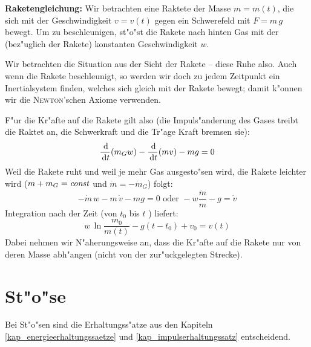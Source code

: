 \begin{Beispiel}
   \textbf{Raketengleichung:} Wir betrachten
   eine Raktete der Masse $m = m(t)$, die sich mit der Geschwindigkeit
   $v = v(t)$ gegen ein Schwerefeld mit $F = m\, g$ bewegt. Um zu
   beschleunigen, st"o"st die Rakete nach hinten Gas mit der
   (bez"uglich der Rakete) konstanten Geschwindigkeit $w$.

   Wir betrachten die Situation aus der Sicht der Rakete -- diese Ruhe
   also. Auch wenn die Rakete beschleunigt, so werden wir doch zu jedem
   Zeitpunkt ein Inertialsystem finden, welches sich gleich mit der
   Rakete bewegt; damit k"onnen wir die \textsc{Newton}'schen Axiome
   verwenden.

   F"ur die Kr"afte auf die Rakete gilt also (die Impuls"anderung des
   Gases treibt die Raktet an, die Schwerkraft und die Tr"age Kraft
   bremsen sie):
   \begin{equation*}
    \frac{\, \mathrm{d} }{\, \mathrm{d} t} (m_G w)  -  \frac{\, \mathrm{d} }{\, \mathrm{d} t}(mv)  -
    mg = 0
   \end{equation*}
   Weil die Rakete ruht und weil je mehr Gas ausgesto"sen wird, die
   Rakete leichter wird ($m + m_G = \text{\emph{const}}$ und $\dot m = -\dot m_G$)
   folgt:
   \begin{equation*}
      -\dot m \, w   - m \,\dot v   - mg = 0
\text{ oder }
-w \frac{\dot m}{m} - g =  \dot v
   \end{equation*}
   Integration nach der Zeit (von $t_0$ bis $t$ ) liefert:
   \begin{equation}
      \label{eq:209}
     w\, \ln\frac{m_0}{m(t)} - g(t-t_0) + v_0 = v(t)
   \end{equation}
   Dabei nehmen wir N"aherungsweise an, dass die Kr"afte auf die
   Rakete nur von deren Masse abh"angen (nicht von der zur"uckgelegten
   Strecke).
\end{Beispiel}









\section{St"o"se}
\label{kap_stoesse}

Bei St"o"sen sind die Erhaltungss"atze aus den Kapiteln
\ref{kap_energieerhaltungssaetze} und \ref{kap_impulserhaltungssatz}
entscheidend.

